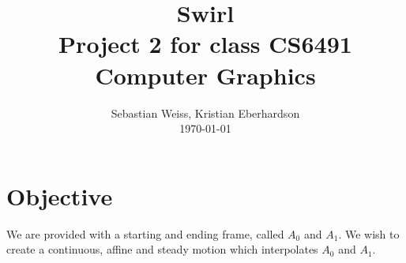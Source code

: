 \documentclass[tikz, journal, letterpaper]{IEEEtran}
\begin{document}
\title{Swirl\\
	{\large Project 2 for class CS6491 Computer Graphics}}
\author{Sebastian Weiss, Kristian Eberhardson\\ \today}

\maketitle


\section{Objective}
We are provided with a starting and ending frame, called $A_0$ and $A_1$. We wish to create a continuous, affine and steady motion which interpolates $A_0$ and $A_1$.
 
\end{document}
